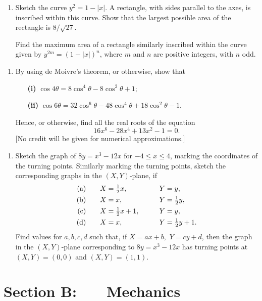 \documentclass[a4, 11pt]{report}
\newlength{\qspace}
\newcounter{qnumber}
\newenvironment{question}%
 {\vspace{\qspace}
  \begin{enumerate}[\bfseries 1\quad][10]%
    \setcounter{enumi}{\value{qnumber}}%
    \item%
 }
{
  \end{enumerate}
  \filbreak
  \stepcounter{qnumber}
 }
\begin{document}
\begin{question}
Sketch the curve $y^{2}=1-\left|x\right|$. A rectangle, with sides
parallel to the axes, is inscribed within this curve. Show that the
largest possible area of the rectangle is $8/\sqrt{27}$. 


Find the maximum area of a rectangle similarly inscribed within the
curve given by $y^{2m}=\left(1-\left|x\right|\right)^{n}$, where
$m$ and $n$ are positive integers, with $n$ odd. 
	\end{question}
	
	\begin{question}
By using de Moivre's theorem, or otherwise, show that 

\begin{itemize}
\setlength{\itemsep}{3mm}
\item[\bf (i)] $\cos4\theta=8\cos^{4}\theta-8\cos^{2}\theta+1;$
\item[\bf (ii)] $\cos6\theta=32\cos^{6}\theta-48\cos^{4}\theta+18\cos^{2}\theta-1.$
\end{itemize}

Hence, or otherwise, find all the real roots of the equation 
\[
16x^{6}-28x^{4}+13x^{2}-1=0.
\]
{[}No credit will be given for numerical approximations.{]} 
		\end{question}
		
		
\begin{question}
Sketch the graph of $8y=x^{3}-12x$ for $-4\leqslant x\leqslant4$,
marking the coordinates of the turning points. Similarly marking the
turning points, sketch the corresponding graphs in the $(X,Y)$-plane,
if
\begin{alignat*}{3}
\rm{(a)} & \quad &  & X=\tfrac{1}{2}x, & \qquad & Y=y,\\
\rm{(b)} &  &  & X=x, &  & Y=\tfrac{1}{2}y,\\
\rm{(c)} &  &  & X=\tfrac{1}{2}x+1, &  & Y=y,\\
\rm{(d)} &  &  & X=x, &  & Y=\tfrac{1}{2}y+1.
\end{alignat*}
 Find values for $a,b,c,d$ such that, if $X=ax+b,$ $Y=cy+d$, then
the graph in the $(X,Y)$-plane corresponding to $8y=x^{3}-12x$ has
turning points at $(X,Y)=(0,0)$ and $(X,Y)=(1,1)$. 
\end{question}

\newpage
\section*{Section B: \ \ \ Mechanics}
\end{document}
